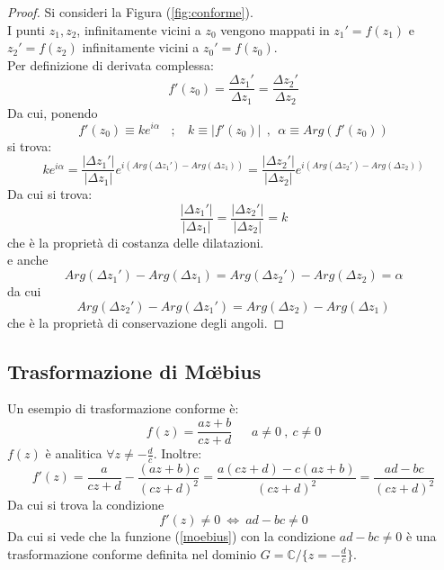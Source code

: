 \documentclass[twoside]{article}
\begin{document}
\begin{proof}
Si consideri la Figura (\ref{fig:conforme}).
\\
I punti $z_1,z_2$, infinitamente vicini a $z_0$ vengono mappati in $z_1'=f(z_1)$ e $z_2'=f(z_2)$ infinitamente vicini a $z_0'=f(z_0)$.
\\
Per definizione di derivata complessa:
\begin{equation}
    f'(z_0)=\frac{\Delta z_1 '}{\Delta z_1}=\frac{\Delta z_2 '}{\Delta z_2}
\end{equation}
Da cui, ponendo
\begin{equation}
    f'(z_0)\equiv k e^{i\alpha} \ \ \ \ ; \ \ \ \ k\equiv |f'(z_0)| \ \ , \ \ \alpha\equiv Arg(f'(z_0))
\end{equation}
si trova:
\begin{equation}
    ke^{i\alpha}=\frac{|\Delta z_1'|}{|\Delta z_1|}e^{i(Arg(\Delta z_1 ')-Arg(\Delta z_1))}=\frac{|\Delta z_2'|}{|\Delta z_2|}e^{i(Arg(\Delta z_2 ')-Arg(\Delta z_2))}
\end{equation}
Da cui si trova:
\begin{equation}
    \frac{|\Delta z_1'|}{|\Delta z_1|}=\frac{|\Delta z_2'|}{|\Delta z_2|}=k
\end{equation}
che è la proprietà di costanza delle dilatazioni. \\
e anche
\begin{equation}
   Arg(\Delta z_1 ')-Arg(\Delta z_1)=Arg(\Delta z_2 ')-Arg(\Delta z_2)=\alpha
\end{equation}
da cui 
\begin{equation}
    Arg(\Delta z_2 ')-Arg(\Delta z_1')=Arg(\Delta z_2)-Arg(\Delta z_1)
\end{equation}
che è la proprietà di conservazione degli angoli.

\end{proof}

\subsection{Trasformazione di M\" \oe bius}

Un esempio di trasformazione conforme è:
\begin{equation}\label{moebius}
    f(z)=\frac{az+b}{cz+d} \ \ \ \ \ \ \ a\ne 0 \ , \ c \ne 0
\end{equation}
$f(z)$ è analitica $\forall z \ne - \frac{d}{c}$. Inoltre:
\begin{equation}
    f'(z)=\frac{a}{cz+d}-\frac{(az+b)c}{(cz+d)^2}=\frac{a(cz+d)-c(az+b)}{(cz+d)^2}=\frac{ad-bc}{(cz+d)^2}
\end{equation}
Da cui si trova la condizione
\begin{equation}
    f'(z)\ne 0 \ \iff \ ad-bc\ne 0
\end{equation}
Da cui si vede che la funzione (\ref{moebius}) con la condizione $ad-bc\ne 0$ è una trasformazione conforme definita nel dominio $G=\mathds{C}/\{ z=-\frac{d}{c}\}$.
\end{document}
